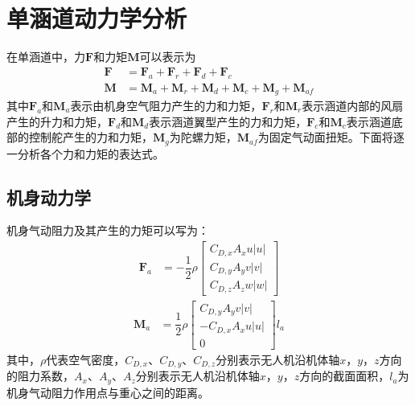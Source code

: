\section{单涵道动力学分析}
在单涵道中，力$ \bm{F} $和力矩$ \bm{M} $可以表示为
\begin{align}
\bm{F} &=\bm{F}_{a}+\bm{F}_{r}+\bm{F}_{d}+\bm{F}_{c} \\
\bm{M} &=\bm{M}_{a}+\bm{M}_{r}+\bm{M}_{d}+\bm{M}_{c}+\bm{M}_{g}+\bm{M}_{a f}
\end{align}
其中$ \bm{F}_a $和$ \bm{M}_{a} $表示由机身空气阻力产生的力和力矩，$ \bm{F}_{r} $和$ \bm{M}_{r} $表示涵道内部的风扇产生的升力和力矩，$ \bm{F}_{d} $和$ \bm{M}_{d} $表示涵道翼型产生的力和力矩，$ \bm{F}_{c} $和$ \bm{M}_{c} $表示涵道底部的控制舵产生的力和力矩，$ \bm{M}_{g} $为陀螺力矩，$ \bm{M}_{a f} $为固定气动面扭矩。下面将逐一分析各个力和力矩的表达式。
\subsection{机身动力学}
机身气动阻力及其产生的力矩可以写为\cite{Johnson_2005}：
\begin{align}
\bm{F}_{{a}} &=-\dfrac{1}{2} \rho\begin{bmatrix}
C_{D, x} A_x u\left|u\right| \\
C_{D, y}  A_y v\left|v\right| \\
C_{D, z}  A_z w\left|w\right|
\end{bmatrix}  	\label{eq_F_a}
\end{align}
\begin{align}
\bm{M}_{{a}} &=\dfrac{1}{2} \rho
\begin{bmatrix}
C_{D, y} A_y v\left|v\right| \\
-C_{D, x} A_x u\left|u\right| \\
0
\end{bmatrix} l_{a }	\label{M_aero}
\end{align}
其中，$ \rho $代表空气密度，$ C_{D,x} $、$ C_{D,y} $、$ C_{D,z} $分别表示无人机沿机体轴$ x $，$ y $，$ z $方向的阻力系数，$A_x $、$ A_y $、$ A_z $分别表示无人机沿机体轴$ x $，$ y $，$ z $方向的截面面积，$ l_{a} $为机身气动阻力作用点与重心之间的距离。
